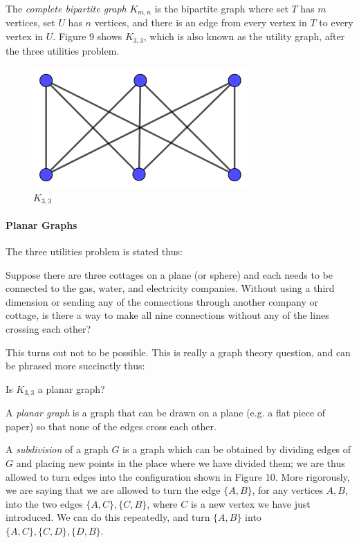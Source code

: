 The \textit{complete bipartite graph} \(K_{m,n}\) is the bipartite graph where set \(T\) has \(m\) vertices, set \(U\) has \(n\) vertices, and there is an edge from every vertex in \(T\) to every vertex in \(U\). Figure 9 shows \(K_{3,3}\), which is also known as the utility graph, after the three utilities problem.



\begin{figure}[h]
\centering
\includegraphics{utilitygraph.png}
\caption{\(K_{3,3}\)}
\label{utilitygraph}
\end{figure}



\paragraph{Planar Graphs}

The three utilities problem is stated thus:

\begin{displayquote}
Suppose there are three cottages on a plane (or sphere) and each needs to be connected to the gas, water, and electricity companies. Without using a third dimension or sending any of the connections through another company or cottage, is there a way to make all nine connections without any of the lines crossing each other?
\end{displayquote}

This turns out not to be possible. This is really a graph theory question, and can be phrased more succinctly thus:

\begin{displayquote}
Is \(K_{3,3}\) a planar graph?
\end{displayquote}

A \textit{planar graph} is a graph that can be drawn on a plane (e.g. a flat piece of paper) so that none of the edges cross each other.

A \textit{subdivision} of a graph \(G\) is a graph which can be obtained by dividing edges of \(G\) and placing new points in the place where we have divided them; we are thus allowed to turn edges into the configuration shown in Figure 10. More rigorously, we are saying that we are allowed to turn the edge \(\{A,B\}\), for any vertices \(A,B\), into the two edges \(\{A,C\},\{C,B\}\), where \(C\) is a new vertex we have just introduced. We can do this repeatedly, and turn \(\{A,B\}\) into \(\{A,C\},\{C,D\},\{D,B\}\).



